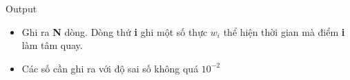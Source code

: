 Output  
\begin{itemize}
	\item     Ghi ra    \textbf{     N    }    dòng. Dòng thứ    \textbf{     i    }    ghi một số thực    \textbf{     $w_{i}$}    thể hiện thời gian mà điểm    \textbf{     i    }    làm tâm quay.   
	\item     Các số cần ghi ra với độ sai số không quá $10^{-2}$
\end{itemize}
